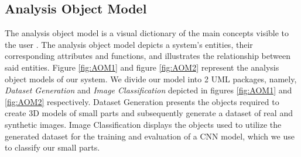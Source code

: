 \newpage
\begin{usecase}





\end{usecase}

\newpage
\subsection{Analysis Object Model}\label{analysis_object_model}
The analysis object model is a visual dictionary of the main concepts visible to the user \cite{bruegge2004object}. The analysis object model depicts a system's entities, their corresponding attributes and functions, and illustrates the relationship between said entities. Figure \ref{fig:AOM1} and figure \ref{fig:AOM2} represent the analysis object models of our system. We divide our model into 2 UML packages, namely, \textit{Dataset Generation} and \textit{Image Classification} depicted in figures \ref{fig:AOM1} and \ref{fig:AOM2} respectively. Dataset Generation presents the objects required to create 3D models of small parts and subsequently generate a dataset of real and synthetic images. Image Classification displays the objects used to utilize the generated dataset for the training and evaluation of a CNN model, which we use to classify our small parts.

